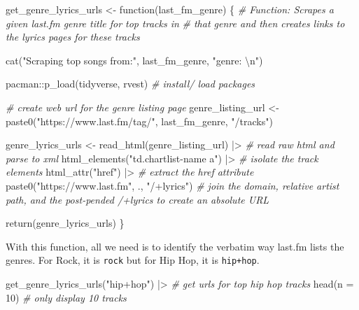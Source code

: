 \documentclass[
  letterpaper,
]{latex/krantz}
\newenvironment{Shaded}{\begin{snugshade}}{\end{snugshade}}
\newcommand{\AttributeTok}[1]{\textcolor[rgb]{0.00,0.00,0.00}{#1}}
\newcommand{\CommentTok}[1]{\textcolor[rgb]{0.00,0.00,0.00}{\textit{#1}}}
\newcommand{\ControlFlowTok}[1]{\textcolor[rgb]{0.00,0.00,0.00}{#1}}
\newcommand{\DecValTok}[1]{\textcolor[rgb]{0.00,0.00,0.00}{#1}}
\newcommand{\FunctionTok}[1]{\textcolor[rgb]{0.00,0.00,0.00}{#1}}
\newcommand{\NormalTok}[1]{\textcolor[rgb]{0.00,0.00,0.00}{#1}}
\newcommand{\OtherTok}[1]{\textcolor[rgb]{0.00,0.00,0.00}{#1}}
\newcommand{\SpecialCharTok}[1]{\textcolor[rgb]{0.00,0.00,0.00}{#1}}
\newcommand{\StringTok}[1]{\textcolor[rgb]{0.00,0.00,0.00}{#1}}
\begin{document}
\begin{Shaded}
\begin{Highlighting}[]
\NormalTok{get\_genre\_lyrics\_urls }\OtherTok{\textless{}{-}} \ControlFlowTok{function}\NormalTok{(last\_fm\_genre) \{}
  \CommentTok{\# Function: Scrapes a given last.fm genre title for top tracks in}
  \CommentTok{\# that genre and then creates links to the lyrics pages for these tracks}
  
  \FunctionTok{cat}\NormalTok{(}\StringTok{"Scraping top songs from:"}\NormalTok{, last\_fm\_genre, }\StringTok{"genre: }\SpecialCharTok{\textbackslash{}n}\StringTok{"}\NormalTok{)}
  
\NormalTok{  pacman}\SpecialCharTok{::}\FunctionTok{p\_load}\NormalTok{(tidyverse, rvest) }\CommentTok{\# install/ load packages}
  
  \CommentTok{\# create web url for the genre listing page}
\NormalTok{  genre\_listing\_url }\OtherTok{\textless{}{-}} 
    \FunctionTok{paste0}\NormalTok{(}\StringTok{"https://www.last.fm/tag/"}\NormalTok{, last\_fm\_genre, }\StringTok{"/tracks"}\NormalTok{) }
  
\NormalTok{  genre\_lyrics\_urls }\OtherTok{\textless{}{-}} 
    \FunctionTok{read\_html}\NormalTok{(genre\_listing\_url) }\SpecialCharTok{|\textgreater{}} \CommentTok{\# read raw html and parse to xml}
    \FunctionTok{html\_elements}\NormalTok{(}\StringTok{"td.chartlist{-}name a"}\NormalTok{) }\SpecialCharTok{|\textgreater{}} \CommentTok{\# isolate the track elements}
    \FunctionTok{html\_attr}\NormalTok{(}\StringTok{"href"}\NormalTok{) }\SpecialCharTok{|\textgreater{}} \CommentTok{\# extract the href attribute}
    \FunctionTok{paste0}\NormalTok{(}\StringTok{"https://www.last.fm"}\NormalTok{, ., }\StringTok{"/+lyrics"}\NormalTok{) }\CommentTok{\# join the domain, relative artist path, and the post{-}pended /+lyrics to create an absolute URL}
  
  \FunctionTok{return}\NormalTok{(genre\_lyrics\_urls)}
\NormalTok{\}}
\end{Highlighting}
\end{Shaded}

With this function, all we need is to identify the verbatim way last.fm
lists the genres. For Rock, it is \texttt{rock} but for Hip Hop, it is
\texttt{hip+hop}.

\begin{Shaded}
\begin{Highlighting}[]
\FunctionTok{get\_genre\_lyrics\_urls}\NormalTok{(}\StringTok{"hip+hop"}\NormalTok{) }\SpecialCharTok{|\textgreater{}}  \CommentTok{\# get urls for top hip hop tracks}
  \FunctionTok{head}\NormalTok{(}\AttributeTok{n =} \DecValTok{10}\NormalTok{) }\CommentTok{\# only display 10 tracks}
\end{Highlighting}
\end{Shaded}
\end{document}
